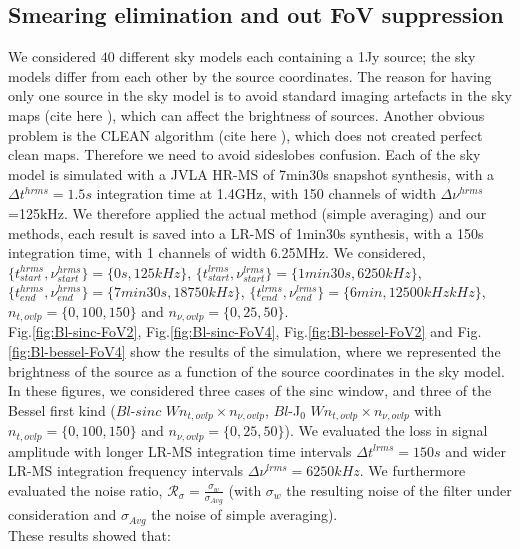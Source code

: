 \documentclass[useAMS,usenatbib]{mn2e}
\begin{document}
\subsection{Smearing elimination and out FoV suppression}
We considered $40$ different sky models each  containing a 1Jy source; the sky models differ from each other by the source coordinates. 
The reason for having  only one source in the sky model is to avoid standard imaging artefacts in the sky maps (cite here \cite{2}), which 
can affect the brightness of sources. Another obvious problem is the  CLEAN algorithm (cite here \cite{2}), which does not created 
perfect clean maps. Therefore we need to avoid sideslobes confusion. Each of the sky model is simulated 
with a JVLA HR-MS of 7min30s snapshot synthesis, with a $\Delta t^{hrms}=1.5s$ integration 
time at 1.4GHz,  with 150 channels of width $\Delta \nu^{hrms}$=125kHz. We therefore applied the actual method (simple averaging) and 
our methods, each result is saved into a LR-MS of 1min30s synthesis, with a 150s integration time,  with 1 channels of width 6.25MHz. We 
considered, $\{t^{hrms}_{start},\nu^{hrms}_{start}\}=\{0s,125kHz\}$, $\{t^{lrms}_{start},\nu^{lrms}_{start}\}=\{1min30s,6250kHz\}$, 
$\{t^{hrms}_{end},\nu^{hrms}_{end}\}=\{7min30s,18750kHz\}$, $\{t^{lrms}_{end},\nu^{lrms}_{end}\}=\{6min,12500kHzkHz\}$, 
$n_{t,ovlp}=\{0,100,150\}$ 
and $n_{\nu,ovlp}=\{0,25,50\}$.\\
Fig.\ref{fig:Bl-sinc-FoV2}, Fig.\ref{fig:Bl-sinc-FoV4}, Fig.\ref{fig:Bl-bessel-FoV2} and Fig.\ref{fig:Bl-bessel-FoV4} show the results of 
the simulation, where we represented the brightness of the source as a function of the source coordinates in the sky model. In these 
figures, we 
considered three cases of the sinc window, and three of the Bessel first kind ($Bl$-$sinc$ $W n_{t,ovlp} \times n_{\nu,ovlp}$, $Bl$-J$_0$ 
$W n_{t,ovlp} \times n_{\nu,ovlp}$ with  $n_{t,ovlp}=\{0,100,150\}$ and $n_{\nu,ovlp}=\{0,25,50\}$). We evaluated the loss in signal 
amplitude with longer LR-MS integration time intervals $\Delta t^{lrms}=150s$ and wider LR-MS integration frequency intervals $\Delta 
\nu^{lrms}=6250kHz$. We furthermore evaluated the  noise ratio, $\mathcal{R}_{\sigma}=\frac{\sigma_{w}}{\sigma_{Avg}}$ (with $\sigma_{w}$  
the resulting noise of the filter under consideration and $\sigma_{Avg}$ the noise of simple averaging).\\
These results showed that:
\end{document}
